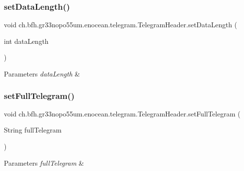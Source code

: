 \subsubsection{\texorpdfstring{set\+Data\+Length()}{setDataLength()}}
{\footnotesize\ttfamily void ch.\+bfh.\+gr33nopo55um.\+enocean.\+telegram.\+Telegram\+Header.\+set\+Data\+Length (\begin{DoxyParamCaption}\item[{int}]{data\+Length }\end{DoxyParamCaption})}


\begin{DoxyParams}{Parameters}
{\em data\+Length} & \\
\hline
\end{DoxyParams}
\hypertarget{classch_1_1bfh_1_1gr33nopo55um_1_1enocean_1_1telegram_1_1_telegram_header_a5ab36491d99972342b849721ff3ad43b}{}\label{classch_1_1bfh_1_1gr33nopo55um_1_1enocean_1_1telegram_1_1_telegram_header_a5ab36491d99972342b849721ff3ad43b} 
\subsubsection{\texorpdfstring{set\+Full\+Telegram()}{setFullTelegram()}}
{\footnotesize\ttfamily void ch.\+bfh.\+gr33nopo55um.\+enocean.\+telegram.\+Telegram\+Header.\+set\+Full\+Telegram (\begin{DoxyParamCaption}\item[{String}]{full\+Telegram }\end{DoxyParamCaption})}


\begin{DoxyParams}{Parameters}
{\em full\+Telegram} & \\
\hline
\end{DoxyParams}
\hypertarget{classch_1_1bfh_1_1gr33nopo55um_1_1enocean_1_1telegram_1_1_telegram_header_acdf067918f2831e911c329886dda9313}{}\label{classch_1_1bfh_1_1gr33nopo55um_1_1enocean_1_1telegram_1_1_telegram_header_acdf067918f2831e911c329886dda9313} 
